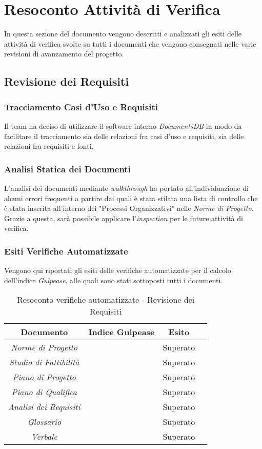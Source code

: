 \newpage
\section{Resoconto Attività di Verifica}
In questa sezione del documento vengono descritti e analizzati gli esiti delle attività di verifica svolte su tutti i documenti che vengono consegnati nelle varie revisioni di avanzamento del progetto.

\subsection{Revisione dei Requisiti}

\subsubsection{Tracciamento Casi d'Uso e Requisiti}
Il team ha deciso di utilizzare il software interno \textit{DocumentsDB} in modo da facilitare il tracciamento sia delle relazioni fra casi d'uso e requisiti, sia delle relazioni fra requisiti e fonti.

\subsubsection{Analisi Statica dei Documenti}
L'analisi dei documenti mediante \textit{walkthrough} ha portato all'individuazione di alcuni errori frequenti a partire dai quali è stata stilata una lista di controllo che è stata inserita all'interno dei "Processi Organizzativi" nelle \textit{Norme di Progetto}. Grazie a questa, sarà possibile applicare l'\textit{inspection} per le future attività di verifica.

\subsubsection{Esiti Verifiche Automatizzate}
Vengono qui riportati gli esiti delle verifiche automatizzate per il calcolo dell'indice \textit{Gulpease}, alle quali sono stati sottoposti tutti i documenti.
\begin{table}[h]
\begin{center}
\begin{tabular}{|c|c|c|c|}
\hline Documento & Indice Gulpease & Esito\\
\hline
\emph{Norme di Progetto} &  & Superato \\
\emph{Studio di Fattibilità} &  & Superato \\
\emph{Piano di Progetto} &  & Superato \\
\emph{Piano di Qualifica} &   & Superato \\
\emph{Analisi dei Requisiti} &  & Superato \\
\emph{Glossario} &  & Superato \\
\emph{Verbale} &  & Superato \\
\hline
\end{tabular}
\caption{Resoconto verifiche automatizzate - Revisione dei Requisiti}
\end{center}
\end{table}